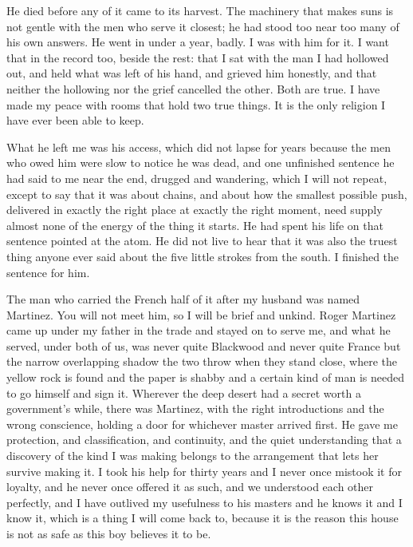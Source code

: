 He died before any of it came to its harvest. The machinery that makes suns is not gentle with the men who serve it closest; he had stood too near too many of his own answers. He went in under a year, badly. I was with him for it. I want that in the record too, beside the rest: that I sat with the man I had hollowed out, and held what was left of his hand, and grieved him honestly, and that neither the hollowing nor the grief cancelled the other. Both are true. I have made my peace with rooms that hold two true things. It is the only religion I have ever been able to keep.\par

What he left me was his access, which did not lapse for years because the men who owed him were slow to notice he was dead, and one unfinished sentence he had said to me near the end, drugged and wandering, which I will not repeat, except to say that it was about chains, and about how the smallest possible push, delivered in exactly the right place at exactly the right moment, need supply almost none of the energy of the thing it starts. He had spent his life on that sentence pointed at the atom. He did not live to hear that it was also the truest thing anyone ever said about the five little strokes from the south. I finished the sentence for him.\par

\ornament

The man who carried the French half of it after my husband was named Martinez. You will not meet him, so I will be brief and unkind. Roger Martinez came up under my father in the trade and stayed on to serve me, and what he served, under both of us, was never quite Blackwood and never quite France but the narrow overlapping shadow the two throw when they stand close, where the yellow rock is found and the paper is shabby and a certain kind of man is needed to go himself and sign it. Wherever the deep desert had a secret worth a government's while, there was Martinez, with the right introductions and the wrong conscience, holding a door for whichever master arrived first. He gave me protection, and classification, and continuity, and the quiet understanding that a discovery of the kind I was making belongs to the arrangement that lets her survive making it. I took his help for thirty years and I never once mistook it for loyalty, and he never once offered it as such, and we understood each other perfectly, and I have outlived my usefulness to his masters and he knows it and I know it, which is a thing I will come back to, because it is the reason this house is not as safe as this boy believes it to be.\par

